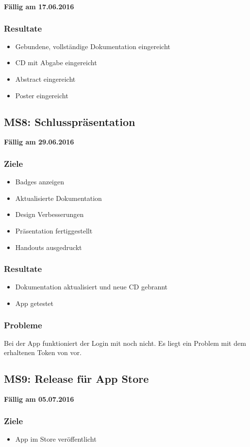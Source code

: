\textbf{Fällig am 17.06.2016}

\subsubsection{Resultate}

\begin{itemize}
	\item Gebundene, vollständige Dokumentation eingereicht
	\item CD mit Abgabe eingereicht
	\item Abstract eingereicht
	\item Poster eingereicht
\end{itemize}


\subsection{MS8: Schlusspräsentation}
\label{pm-ms8}

\textbf{Fällig am 29.06.2016}

\subsubsection{Ziele}

\begin{itemize}
	\item Badges anzeigen
	\item Aktualisierte Dokumentation
	\item Design Verbesserungen
	\item Präsentation fertiggestellt
	\item Handouts ausgedruckt
\end{itemize}

\subsubsection{Resultate}

\begin{itemize}
	\item Dokumentation aktualisiert und neue CD gebrannt
	\item {} App getestet
\end{itemize}

\subsubsection{Probleme}
Bei der  App funktioniert der Login mit  noch nicht. 
Es liegt ein Problem mit dem erhaltenen Token von  vor.

\subsection{MS9: Release für App Store}
\label{pm-ms9}

\textbf{Fällig am 05.07.2016}

\subsubsection{Ziele}

\begin{itemize}
	\item {} App im  Store veröffentlicht
\end{itemize}
